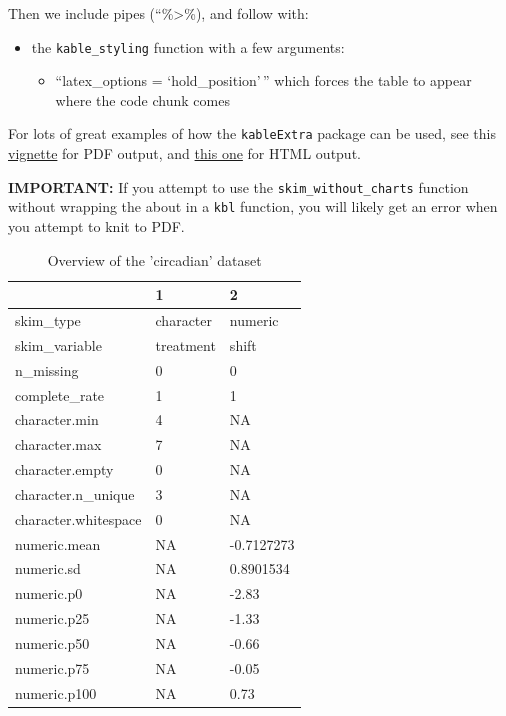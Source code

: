 \documentclass[
]{book}
\providecommand{\tightlist}{%
  \setlength{\itemsep}{0pt}\setlength{\parskip}{0pt}}
\begin{document}
Then we include pipes (``\%\textgreater\%), and follow with:

\begin{itemize}
\tightlist
\item
  the \texttt{kable\_styling} function with a few arguments:

  \begin{itemize}
  \tightlist
  \item
    ``latex\_options = `hold\_position'\,'' which forces the table to appear where the code chunk comes
  \end{itemize}
\end{itemize}

For lots of great examples of how the \texttt{kableExtra} package can be used, see this \href{https://haozhu233.github.io/kableExtra/awesome_table_in_pdf.pdf}{vignette} for PDF output, and \href{https://cran.r-project.org/web/packages/kableExtra/vignettes/awesome_table_in_html.html}{this one} for HTML output.

\textbf{IMPORTANT: }
If you attempt to use the \texttt{skim\_without\_charts} function without wrapping the about in a \texttt{kbl} function, you will likely get an error when you attempt to knit to PDF.

\begin{table}[!h]
\centering
\caption{\label{tab:showskimtable}Overview of the 'circadian' dataset}
\centering
\begin{tabular}[t]{lll}
\toprule
  & 1 & 2\\
\midrule
skim\_type & character & numeric\\
skim\_variable & treatment & shift\\
n\_missing & 0 & 0\\
complete\_rate & 1 & 1\\
character.min & 4 & NA\\
\addlinespace
character.max & 7 & NA\\
character.empty & 0 & NA\\
character.n\_unique & 3 & NA\\
character.whitespace & 0 & NA\\
numeric.mean & NA & -0.7127273\\
\addlinespace
numeric.sd & NA & 0.8901534\\
numeric.p0 & NA & -2.83\\
numeric.p25 & NA & -1.33\\
numeric.p50 & NA & -0.66\\
numeric.p75 & NA & -0.05\\
\addlinespace
numeric.p100 & NA & 0.73\\
\bottomrule
\end{tabular}
\end{table}
\end{document}
